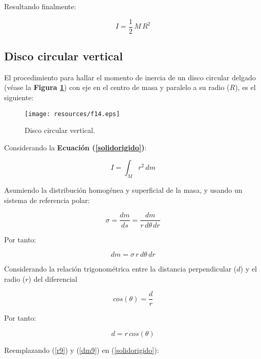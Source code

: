 \documentclass[letter,oneside,11pt]{article}
\begin{document}
Resultando finalmente:

\begin{equation}
    I = \frac{1}{2}\, M\, R^2
\end{equation}

\subsection{Disco circular vertical}
El procedimiento para hallar el momento de inercia de un disco circular delgado
(véase la \textbf{Figura \ref{figura14}}) con eje en el centro de masa y
paralelo a su radio ($R$), es el siguiente:

\begin{figure}
\centering
\texttt{[image: resources/f14.eps]}
\caption{Disco circular vertical.}
\label{figura14}
\end{figure}

Considerando la \textbf{Ecuación (\ref{solidorigido})}:

\begin{equation*}
    I = \int_{M} r^2\, dm
\tag{4}
\end{equation*}

Asumiendo la distribución homogénea y superficial de la masa, y usando un
sistema de referencia polar:

\begin{equation*}
    \sigma = \frac{dm}{ds} = \frac{dm}{r\, d\theta\, dr}
\end{equation*}

Por tanto:

\begin{equation}
    dm = \sigma\, r\, d\theta\, dr
\label{dm9}
\end{equation}

Considerando la relación trigonométrica entre la distancia perpendicular ($d$) y
el radio ($r$) del diferencial

\begin{equation*}
    cos (\theta) = \frac{d}{r}
\end{equation*}

Por tanto:

\begin{equation}
    d = r\, cos(\theta)
\label{r9}
\end{equation}

Reemplazando (\ref{r9}) y (\ref{dm9}) en (\ref{solidorigido}): 
\end{document}
